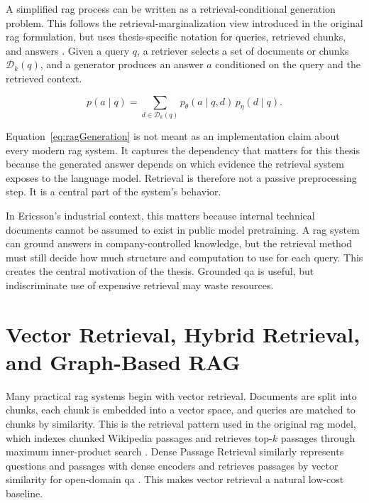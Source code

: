 \documentclass[english, bibtex]{kththesis}               %
\numberwithin{listing}{chapter}
\begin{document}
A simplified \gls{rag} process can be written as a retrieval-conditional generation problem. This follows the retrieval-marginalization view introduced in the original \gls{rag} formulation, but uses thesis-specific notation for queries, retrieved chunks, and answers \cite{lewis2020rag}. Given a query \(q\), a retriever selects a set of documents or chunks \(\mathcal{D}_k(q)\), and a generator produces an answer \(a\) conditioned on the query and the retrieved context.

\begin{equation}
\label{eq:ragGeneration}
p(a \mid q) =
\sum_{d \in \mathcal{D}_k(q)}
p_\theta(a \mid q,d)\,p_\eta(d \mid q).
\end{equation}

Equation~\ref{eq:ragGeneration} is not meant as an implementation claim about every modern \gls{rag} system. It captures the dependency that matters for this thesis because the generated answer depends on which evidence the retrieval system exposes to the language model. Retrieval is therefore not a passive preprocessing step. It is a central part of the system's behavior.

In Ericsson's industrial context, this matters because internal technical documents cannot be assumed to exist in public model pretraining. A \gls{rag} system can ground answers in company-controlled knowledge, but the retrieval method must still decide how much structure and computation to use for each query. This creates the central motivation of the thesis. Grounded \gls{qa} is useful, but indiscriminate use of expensive retrieval may waste resources.

\section{Vector Retrieval, Hybrid Retrieval, and Graph-Based RAG}
\label{sec:backgroundHybridGraph}

Many practical \gls{rag} systems begin with vector retrieval. Documents are split into chunks, each chunk is embedded into a vector space, and queries are matched to chunks by similarity. This is the retrieval pattern used in the original \gls{rag} model, which indexes chunked Wikipedia passages and retrieves top-\(k\) passages through maximum inner-product search \cite{lewis2020rag}. Dense Passage Retrieval similarly represents questions and passages with dense encoders and retrieves passages by vector similarity for open-domain \gls{qa} \cite{karpukhin2020dpr}. This makes vector retrieval a natural low-cost baseline.
\end{document}

